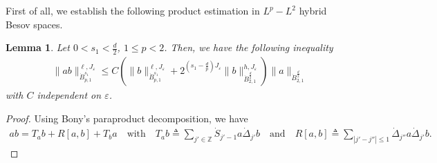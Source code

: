 \documentclass{amsart}
\newtheorem{lemma}[theorem]{Lemma}
\theoremstyle{definition}
\theoremstyle{remark}
\numberwithin{equation}{section}
\def\ddjj{\dot \Delta_{j'}}
\def\dB{{\dot {B}}}
\newcommand\Z{\mathbb{Z}}
\begin{document}
First of all, we establish the following product estimation in $L^p-L^2$ hybrid Besov spaces.
\begin{lemma}\label{NonClassicalProLaw1}
Let $0<s_1<\frac{d}{2}$, $1\leq p<2$. Then, we have the following inequality
\begin{align}\label{newproduct}
\|ab\|_{\dB_{p,1}^{s_1}}^{\ell,J_\varepsilon}
\leq C
\left(\|b\|_{\dB_{p,1}^{s_1}}^{\ell,J_\varepsilon}+ 2^{(s_1-\frac{d}{p})J_\varepsilon}\|b\|_{\dB_{2,1}^{\frac{d}{2}}}^{h,J_\varepsilon} \right)\|a\|_{\dB_{2,1}^{\frac{d}{2}}}
\end{align}
with $C$ independent on $\varepsilon$.
\end{lemma}

\begin{proof}
Using Bony's paraproduct decomposition, we have
\begin{equation}\nonumber
\begin{aligned}
ab=T_{a}b+R[a,b]+T_{b}a\quad \mbox{with}\quad
T_{a}b\triangleq\sum_{j'\in \Z} \dot S_{j'-1}a \ddjj b\quad\mbox{and}\quad
R[a,b]\triangleq\sum_{|j'-j''|\leq 1} \dot\Delta_{j''} a \ddjj b.
\end{aligned}
\end{equation}


\end{proof}
\end{document}
